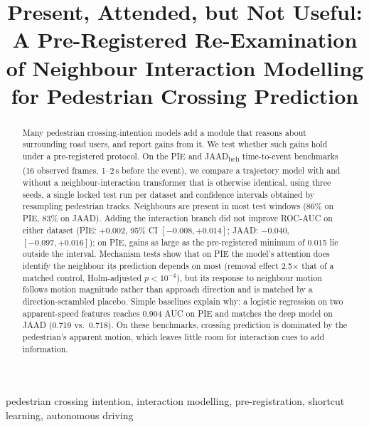 \documentclass[conference]{IEEEtran}
\begin{document}
\title{Present, Attended, but Not Useful: A Pre-Registered Re-Examination of Neighbour Interaction Modelling for Pedestrian Crossing Prediction}

\author{
}

\maketitle

\begin{abstract}
Many pedestrian crossing-intention models add a module that reasons about surrounding road users, and report gains from it. We test whether such gains hold under a pre-registered protocol. On the PIE and JAAD\textsubscript{beh} time-to-event benchmarks (16 observed frames, 1--2\,s before the event), we compare a trajectory model with and without a neighbour-interaction transformer that is otherwise identical, using three seeds, a single locked test run per dataset and confidence intervals obtained by resampling pedestrian tracks. Neighbours are present in most test windows (86\% on PIE, 83\% on JAAD). Adding the interaction branch did not improve ROC-AUC on either dataset (PIE: $+0.002$, 95\% CI $[-0.008, +0.014]$; JAAD: $-0.040$, $[-0.097, +0.016]$); on PIE, gains as large as the pre-registered minimum of 0.015 lie outside the interval. Mechanism tests show that on PIE the model's attention does identify the neighbour its prediction depends on most (removal effect 2.5$\times$ that of a matched control, Holm-adjusted $p<10^{-4}$), but its response to neighbour motion follows motion magnitude rather than approach direction and is matched by a direction-scrambled placebo. Simple baselines explain why: a logistic regression on two apparent-speed features reaches 0.904 AUC on PIE and matches the deep model on JAAD (0.719 vs.\ 0.718). On these benchmarks, crossing prediction is dominated by the pedestrian's apparent motion, which leaves little room for interaction cues to add information.
\end{abstract}

\begin{IEEEkeywords}
pedestrian crossing intention, interaction modelling, pre-registration, shortcut learning, autonomous driving
\end{IEEEkeywords}
\end{document}
